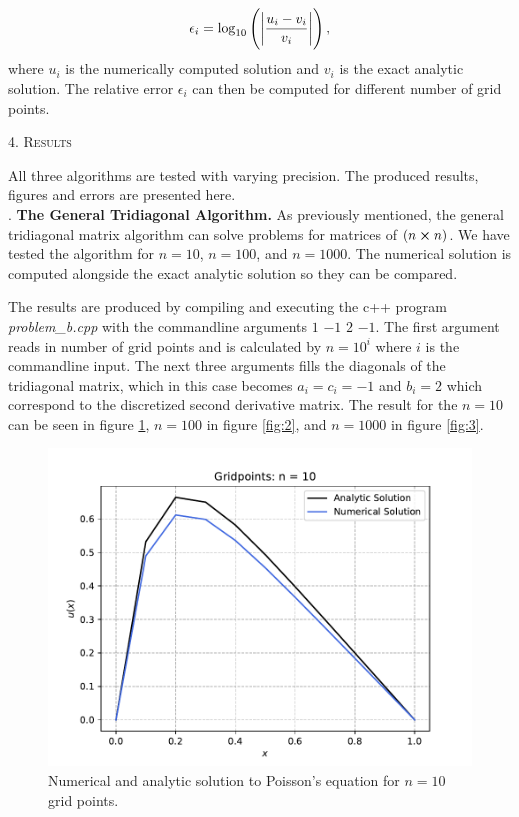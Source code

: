 \documentclass[a4paper,10pt]{article}
\begin{document}
\begin{equation}\label{eq:15}
\epsilon_i = \log_{10} \left( \abs{\frac{u_i - v_i}{v_i}} \right),
\end{equation}
where $u_i$ is the numerically computed solution and $v_i$ is the exact analytic solution. The relative error $\epsilon_i$ can then be computed for different number of grid points.

\bigskip

\begin{center}
\textsc{4. Results}
\end{center}

\noindent All three algorithms are tested with varying precision. The produced results, figures and errors are presented here.\\

. \textbf{The General Tridiagonal Algorithm.} As previously mentioned, the general tridiagonal matrix algorithm can solve problems for matrices of $(n \cross n)$. We have tested the algorithm for $n = 10$, $n = 100$, and  $n = 1000$. The numerical solution is computed alongside the exact analytic solution so they can be compared.

The results are produced by compiling and executing the c++ program \textit{problem\_b.cpp} with the commandline arguments $1$ $-1$ $2$ $-1$. The first argument reads in number of grid points and is calculated by $n = 10^i$ where $i$ is the commandline input. The next three arguments fills the diagonals of the tridiagonal matrix, which in this case becomes $a_i = c_i  = -1$ and $b_i = 2$ which correspond to the discretized second derivative matrix. The result for the $n= 10$ can be seen in figure \ref{fig:1}, $n = 100$ in figure \ref{fig:2}, and $n=1000$ in figure \ref{fig:3}.

\begin{figure}[h]
  \centering
  \includegraphics[width=0.9\linewidth]{figures/fig_10_b.pdf}
  \caption{Numerical and analytic solution to Poisson's equation for $n = 10$ grid points. }
  \label{fig:1}
\end{figure}
\end{document}
